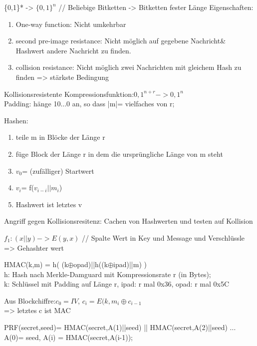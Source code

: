 \{0,1\}* -> $\{0,1\}^n$ // Beliebige Bitketten -> Bitketten fester Länge
Eigenschaften: \begin{enumerate}
\item One-way function: Nicht umkehrbar
\item second pre-image resistance: Nicht möglich auf gegebene Nachricht\& Hashwert andere Nachricht zu finden.
\item collision resistance: Nicht möglich zwei Nachrichten mit gleichem Hash zu finden => stärkste Bedingung
\end{enumerate}

Kollisionsresistente Kompressionsfunktion:${0,1}^{n+r} -> {0,1}^n$	\\

Padding: hänge 10$\dots$0 an, so dass |m|= vielfaches von r;

Hashen: 
\begin{enumerate}
\item teile m in Blöcke der Länge r
\item füge Block der Länge r in dem die ursprüngliche Länge von m steht
\item $v_0$= (zufälliger) Startwert
\item $v_i$= f($v_{i-i}||m_i$)
\item Hashwert ist letztes v
\end{enumerate}

Angriff gegen Kollisionsresitenz: Cachen von Hashwerten und testen auf Kollision

$f_1: (x||y) -> E(y,x)$ // Spalte Wert in Key und Message und Verschlüssle => Gehashter wert 

HMAC(k,m) = h( (k$\oplus$opad)||h((k$\oplus$ipad)||m) )\\
h: Hash nach Merkle-Damguard mit Kompressionsrate r (in Bytes);\\
k: Schlüssel mit Padding auf Länge r, ipad: r mal 0x36, opad: r mal 0x5C

Aus Blockchiffre:$c_0=IV$, $c_i= E(k,m_i\oplus c_{i-1}$\\
=> letztes c ist MAC

PRF(secret,seed)= HMAC(secret,A(1)||seed) || HMAC(secret,A(2)||seed) ...\\
A(0)= seed, A(i) = HMAC(secret,A(i-1));